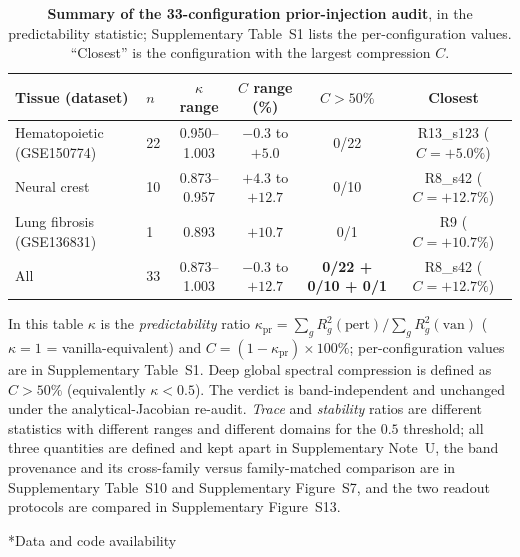 \documentclass[11pt,a4paper]{article}
\makeatletter
\renewcommand{\section}{\@startsection{section}{1}{0pt}{12pt plus 6pt}{6pt}{\large\bfseries}}
\makeatother
\begin{document}
\begin{table}[ht]
\centering
\caption{\textbf{Summary of the 33-configuration prior-injection audit}, in the predictability statistic; Supplementary Table~S1 lists the per-configuration values. ``Closest'' is the configuration with the largest compression $C$.}
\label{tab:audit_summary}
\small
\setlength{\tabcolsep}{4pt}
\begin{tabular}{@{}llcccc@{}}
\toprule
\textbf{Tissue (dataset)} & \textbf{$n$} & \textbf{$\kappa$ range} & \textbf{$C$ range (\%)} & \textbf{$C>50\%$} & \textbf{Closest} \\
\midrule
Hematopoietic (GSE150774) & 22 & 0.950--1.003 & $-0.3$ to $+5.0$ & 0/22 & R13\_s123 ($C=+5.0\%$) \\
Neural crest & 10 & 0.873--0.957 & $+4.3$ to $+12.7$ & 0/10 & R8\_s42 ($C=+12.7\%$) \\
Lung fibrosis (GSE136831) & 1 & 0.893 & $+10.7$ & 0/1 & R9 ($C=+10.7\%$) \\
\midrule
All & 33 & 0.873--1.003 & $-0.3$ to $+12.7$ & \textbf{0/22 + 0/10 + 0/1} & R8\_s42 ($C=+12.7\%$) \\
\bottomrule
\end{tabular}
\vspace{4pt}
\footnotesize{In this table $\kappa$ is the \emph{predictability} ratio $\kappa_{\mathrm{pr}}=\sum_g R^2_g(\text{pert})/\sum_g R^2_g(\text{van})$ ($\kappa=1$ = vanilla-equivalent) and $C=(1-\kappa_{\mathrm{pr}})\times100\%$; per-configuration values are in Supplementary Table~S1. Deep global spectral compression is defined as $C>50\%$ (equivalently $\kappa<0.5$). The verdict is band-independent and unchanged under the analytical-Jacobian re-audit. \emph{Trace} and \emph{stability} ratios are different statistics with different ranges and different domains for the $0.5$ threshold; all three quantities are defined and kept apart in Supplementary Note~U, the band provenance and its cross-family versus family-matched comparison are in Supplementary Table~S10 and Supplementary Figure~S7, and the two readout protocols are compared in Supplementary Figure~S13.}
\end{table}

\clearpage

\section*{Data and code availability}
\end{document}
